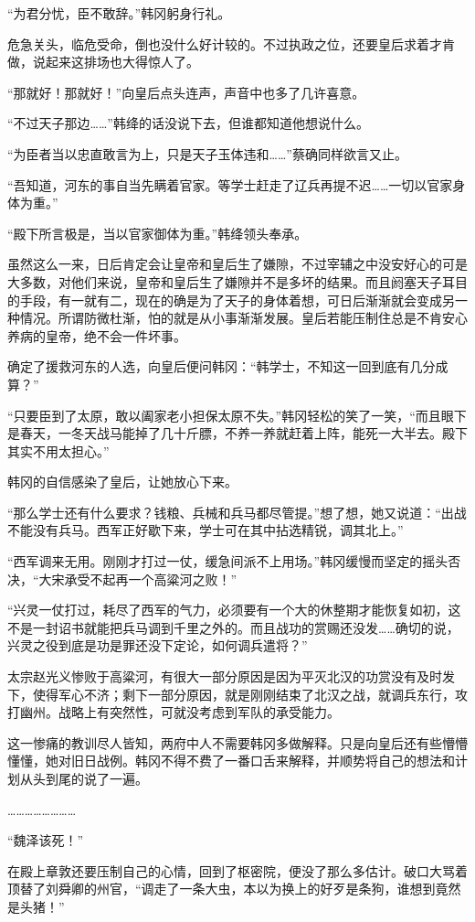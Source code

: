 “为君分忧，臣不敢辞。”韩冈躬身行礼。

危急关头，临危受命，倒也没什么好计较的。不过执政之位，还要皇后求着才肯做，说起来这排场也大得惊人了。

“那就好！那就好！”向皇后点头连声，声音中也多了几许喜意。

“不过天子那边……”韩绛的话没说下去，但谁都知道他想说什么。

“为臣者当以忠直敢言为上，只是天子玉体违和……”蔡确同样欲言又止。

“吾知道，河东的事自当先瞒着官家。等学士赶走了辽兵再提不迟……一切以官家身体为重。”

“殿下所言极是，当以官家御体为重。”韩绛领头奉承。

虽然这么一来，日后肯定会让皇帝和皇后生了嫌隙，不过宰辅之中没安好心的可是大多数，对他们来说，皇帝和皇后生了嫌隙并不是多坏的结果。而且阏塞天子耳目的手段，有一就有二，现在的确是为了天子的身体着想，可日后渐渐就会变成另一种情况。所谓防微杜渐，怕的就是从小事渐渐发展。皇后若能压制住总是不肯安心养病的皇帝，绝不会一件坏事。

确定了援救河东的人选，向皇后便问韩冈：“韩学士，不知这一回到底有几分成算？”

“只要臣到了太原，敢以阖家老小担保太原不失。”韩冈轻松的笑了一笑，“而且眼下是春天，一冬天战马能掉了几十斤膘，不养一养就赶着上阵，能死一大半去。殿下其实不用太担心。”

韩冈的自信感染了皇后，让她放心下来。

“那么学士还有什么要求？钱粮、兵械和兵马都尽管提。”想了想，她又说道：“出战不能没有兵马。西军正好歇下来，学士可在其中拈选精锐，调其北上。”

“西军调来无用。刚刚才打过一仗，缓急间派不上用场。”韩冈缓慢而坚定的摇头否决，“大宋承受不起再一个高粱河之败！”

“兴灵一仗打过，耗尽了西军的气力，必须要有一个大的休整期才能恢复如初，这不是一封诏书就能把兵马调到千里之外的。而且战功的赏赐还没发……确切的说，兴灵之役到底是功是罪还没下定论，如何调兵遣将？”

太宗赵光义惨败于高粱河，有很大一部分原因是因为平灭北汉的功赏没有及时发下，使得军心不济；剩下一部分原因，就是刚刚结束了北汉之战，就调兵东行，攻打幽州。战略上有突然性，可就没考虑到军队的承受能力。

这一惨痛的教训尽人皆知，两府中人不需要韩冈多做解释。只是向皇后还有些懵懵懂懂，她对旧日战例。韩冈不得不费了一番口舌来解释，并顺势将自己的想法和计划从头到尾的说了一遍。

……………………

“魏泽该死！”

在殿上章敦还要压制自己的心情，回到了枢密院，便没了那么多估计。破口大骂着顶替了刘舜卿的州官，“调走了一条大虫，本以为换上的好歹是条狗，谁想到竟然是头猪！”

